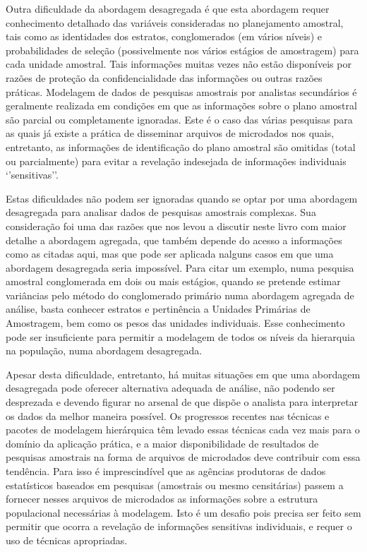 \documentclass[]{book}
\numberwithin{example}{chapter}
\numberwithin{remark}{chapter}
\numberwithin{definition}{chapter}
\begin{document}
Outra dificuldade da abordagem desagregada é que esta abordagem requer
conhecimento detalhado das variáveis consideradas no planejamento
amostral, tais como as identidades dos estratos, conglomerados (em
vários níveis) e probabilidades de seleção (possivelmente nos vários
estágios de amostragem) para cada unidade amostral. Tais informações
muitas vezes não estão disponíveis por razões de proteção da
confidencialidade das informações ou outras razões práticas. Modelagem
de dados de pesquisas amostrais por analistas secundários é geralmente
realizada em condições em que as informações sobre o plano amostral são
parcial ou completamente ignoradas. Este é o caso das várias pesquisas
para as quais já existe a prática de disseminar arquivos de microdados
nos quais, entretanto, as informações de identificação do plano amostral
são omitidas (total ou parcialmente) para evitar a revelação indesejada
de informações individuais `'sensitivas''.

Estas dificuldades não podem ser ignoradas quando se optar por uma
abordagem desagregada para analisar dados de pesquisas amostrais
complexas. Sua consideração foi uma das razões que nos levou a discutir
neste livro com maior detalhe a abordagem agregada, que também depende
do acesso a informações como as citadas aqui, mas que pode ser aplicada
nalguns casos em que uma abordagem desagregada seria impossível. Para
citar um exemplo, numa pesquisa amostral conglomerada em dois ou mais
estágios, quando se pretende estimar variâncias pelo método do
conglomerado primário numa abordagem agregada de análise, basta conhecer
estratos e pertinência a Unidades Primárias de Amostragem, bem como os
pesos das unidades individuais. Esse conhecimento pode ser insuficiente
para permitir a modelagem de todos os níveis da hierarquia na população,
numa abordagem desagregada.

Apesar desta dificuldade, entretanto, há muitas situações em que uma
abordagem desagregada pode oferecer alternativa adequada de análise, não
podendo ser desprezada e devendo figurar no arsenal de que dispõe o
analista para interpretar os dados da melhor maneira possível. Os
progressos recentes nas técnicas e pacotes de modelagem hierárquica têm
levado essas técnicas cada vez mais para o domínio da aplicação prática,
e a maior disponibilidade de resultados de pesquisas amostrais na forma
de arquivos de microdados deve contribuir com essa tendência. Para isso
é imprescindível que as agências produtoras de dados estatísticos
baseados em pesquisas (amostrais ou mesmo censitárias) passem a fornecer
nesses arquivos de microdados as informações sobre a estrutura
populacional necessárias à modelagem. Isto é um desafio pois precisa ser
feito sem permitir que ocorra a revelação de informações sensitivas
individuais, e requer o uso de técnicas apropriadas.
\end{document}
